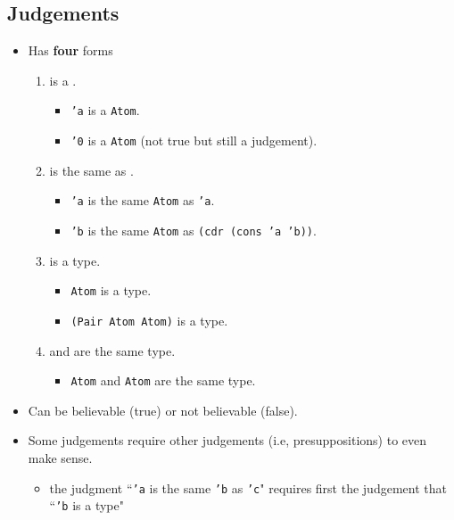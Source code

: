 \documentclass{article}
\newcommand{\ttt}[1]{\texttt{#1}}
\begin{document}
\subsection{Judgements}
\begin{itemize}
    \item Has \textbf{four} forms
        \begin{enumerate}
            \item \underline{\phantom{blank}} is a \underline{\phantom{blank}}.
                \begin{itemize}
                    \item \ttt{'a} is a \ttt{Atom}.
                    \item \ttt{'0} is a \ttt{Atom} (not true but still a judgement).
                \end{itemize}
            \item \underline{\phantom{blank}} is the same \underline{\phantom{blank}} as \underline{\phantom{blank}}.
                \begin{itemize}
                    \item \ttt{'a} is the same \ttt{Atom} as \ttt{'a}.
                    \item \ttt{'b} is the same \ttt{Atom} as \ttt{(cdr (cons 'a 'b))}.
                \end{itemize}
            \item \underline{\phantom{blank}} is a type.
                \begin{itemize}
                    \item \ttt{Atom} is a type.
                    \item \ttt{(Pair Atom Atom)} is a type.
                \end{itemize}
            \item \underline{\phantom{blank}} and \underline{\phantom{blank}} are the same type.
                \begin{itemize}
                    \item \ttt{Atom} and \ttt{Atom} are the same type.
                \end{itemize}
        \end{enumerate}
    \item Can be believable (true) or not believable (false).
    \item Some judgements require other judgements (i.e, presuppositions) to even make sense.
        \begin{itemize}
            \item the judgment ``\ttt{'a} is the same \ttt{'b} as \ttt{'c}" requires first the judgement that ``\ttt{'b} is a type"
        \end{itemize}
\end{itemize}
\end{document}
